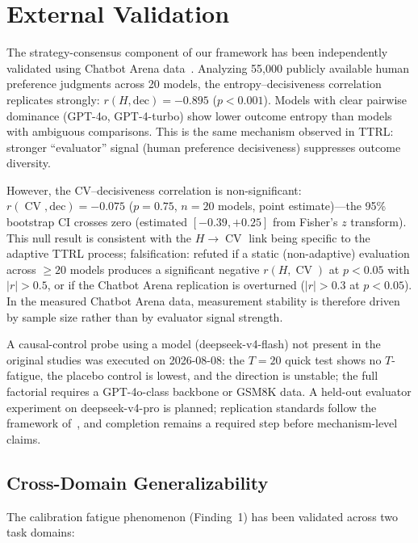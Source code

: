 \documentclass[11pt]{article}
\DeclareMathOperator{\CV}{CV}
\begin{document}
\section{External Validation}

The strategy-consensus component of our framework has been independently validated using Chatbot Arena data~\cite{zheng2023chatbot,chiang2024chatbot}. Analyzing 55,000 publicly available human preference judgments across 20 models, the entropy--decisiveness correlation replicates strongly: $r(H, \text{dec}) = -0.895$ ($p < 0.001$). Models with clear pairwise dominance (GPT-4o, GPT-4-turbo) show lower outcome entropy than models with ambiguous comparisons. This is the same mechanism observed in TTRL: stronger ``evaluator'' signal (human preference decisiveness) suppresses outcome diversity.

However, the CV--decisiveness correlation is non-significant: $r(\CV, \text{dec}) = -0.075$ ($p = 0.75$, $n = 20$ models, point estimate)---the 95\% bootstrap CI crosses zero (estimated $[-0.39, +0.25]$ from Fisher's $z$ transform). This null result is consistent with the $H \to \CV$ link being specific to the adaptive TTRL process; falsification: refuted if a static (non-adaptive) evaluation across $\geq 20$ models produces a significant negative $r(H, \CV)$ at $p < 0.05$ with $|r| > 0.5$, or if the Chatbot Arena replication is overturned ($|r| > 0.3$ at $p < 0.05$). In the measured Chatbot Arena data, measurement stability is therefore driven by sample size rather than by evaluator signal strength.

A causal-control probe using a model (deepseek-v4-flash) not present in the original studies was executed on 2026-08-08: the $T{=}20$ quick test shows no $T$-fatigue, the placebo control is lowest, and the direction is unstable; the full factorial requires a GPT-4o-class backbone or GSM8K data. A held-out evaluator experiment on deepseek-v4-pro is planned; replication standards follow the framework of~\citet{ioannidis2005most,button2013power}, and completion remains a required step before mechanism-level claims.

\subsection{Cross-Domain Generalizability}

The calibration fatigue phenomenon (Finding~1) has been validated across two task domains:
\end{document}
